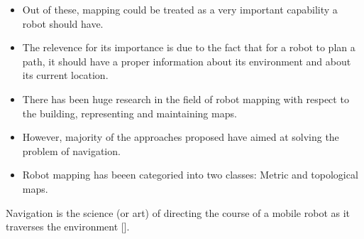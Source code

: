 \begin{itemize}
	




 \item Out of these, mapping could be treated as a very important capability a robot should have.
 \item The relevence for its importance is due to the fact that for a robot to plan a path, it should have a proper information about its environment and about its current location.
 \item There has been huge research in the field of robot mapping  with respect to the building, representing and maintaining maps.  
 \item However, majority of the approaches proposed have aimed at solving the problem of navigation.
 \item Robot mapping has beeen categoried into two classes: Metric and topological maps. 
\end{itemize}
\newpage

{Navigation} is the science (or art) of directing the course of a mobile robot as it traverses the environment  [].

